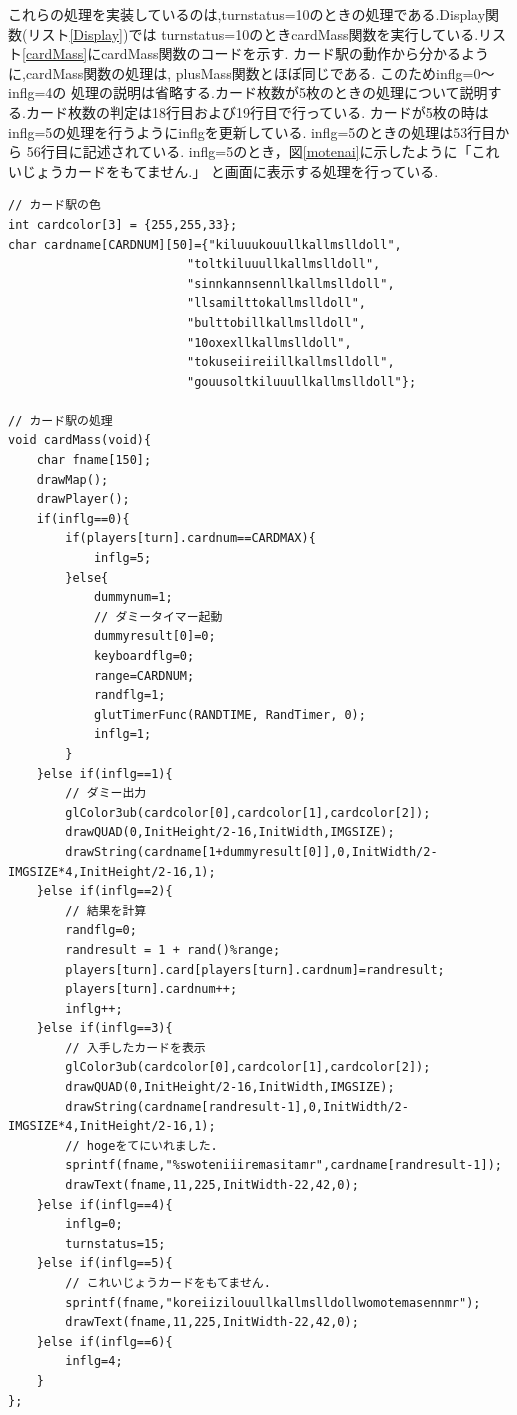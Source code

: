 \documentclass[a4j]{jarticle}
\begin{document}
        これらの処理を実装しているのは,turnstatus=10のときの処理である.Display関数(リスト\ref{Display})では
        turnstatus=10のときcardMass関数を実行している.リスト\ref{cardMass}にcardMass関数のコードを示す.
        カード駅の動作から分かるように,cardMass関数の処理は, plusMass関数とほぼ同じである. このためinflg=0～inflg=4の
        処理の説明は省略する.カード枚数が5枚のときの処理について説明する.カード枚数の判定は18行目および19行目で行っている.
        カードが5枚の時はinflg=5の処理を行うようにinflgを更新している. inflg=5のときの処理は53行目から
        56行目に記述されている. inflg=5のとき，図\ref{motenai}に示したように「これいじょうカードをもてません.」
        と画面に表示する処理を行っている.
        \begin{lstlisting}[basicstyle=\ttfamily\footnotesize, frame=single,label=cardMass,caption=cardMass関数]
// カード駅の色
int cardcolor[3] = {255,255,33};
char cardname[CARDNUM][50]={"kiluuukouullkallmslldoll",
                         "toltkiluuullkallmslldoll",
                         "sinnkannsennllkallmslldoll",
                         "llsamilttokallmslldoll",
                         "bulttobillkallmslldoll",
                         "10oxexllkallmslldoll",
                         "tokuseiireiillkallmslldoll",
                         "gouusoltkiluuullkallmslldoll"};

// カード駅の処理
void cardMass(void){
    char fname[150];
    drawMap();
    drawPlayer(); 
    if(inflg==0){
        if(players[turn].cardnum==CARDMAX){
            inflg=5;
        }else{
            dummynum=1;
            // ダミータイマー起動
            dummyresult[0]=0;
            keyboardflg=0;
            range=CARDNUM;
            randflg=1;
            glutTimerFunc(RANDTIME, RandTimer, 0);
            inflg=1;
        }            
    }else if(inflg==1){
        // ダミー出力
        glColor3ub(cardcolor[0],cardcolor[1],cardcolor[2]);
        drawQUAD(0,InitHeight/2-16,InitWidth,IMGSIZE);
        drawString(cardname[1+dummyresult[0]],0,InitWidth/2-IMGSIZE*4,InitHeight/2-16,1);           
    }else if(inflg==2){
        // 結果を計算
        randflg=0;
        randresult = 1 + rand()%range;
        players[turn].card[players[turn].cardnum]=randresult;
        players[turn].cardnum++;
        inflg++;
    }else if(inflg==3){
        // 入手したカードを表示
        glColor3ub(cardcolor[0],cardcolor[1],cardcolor[2]);
        drawQUAD(0,InitHeight/2-16,InitWidth,IMGSIZE);
        drawString(cardname[randresult-1],0,InitWidth/2-IMGSIZE*4,InitHeight/2-16,1); 
        // hogeをてにいれました.
        sprintf(fname,"%swoteniiiremasitamr",cardname[randresult-1]);
        drawText(fname,11,225,InitWidth-22,42,0);                     
    }else if(inflg==4){
        inflg=0;
        turnstatus=15;
    }else if(inflg==5){
        // これいじょうカードをもてません.
        sprintf(fname,"koreiizilouullkallmslldollwomotemasennmr");
        drawText(fname,11,225,InitWidth-22,42,0);            
    }else if(inflg==6){
        inflg=4;
    }
};
        \end{lstlisting}
\end{document}
